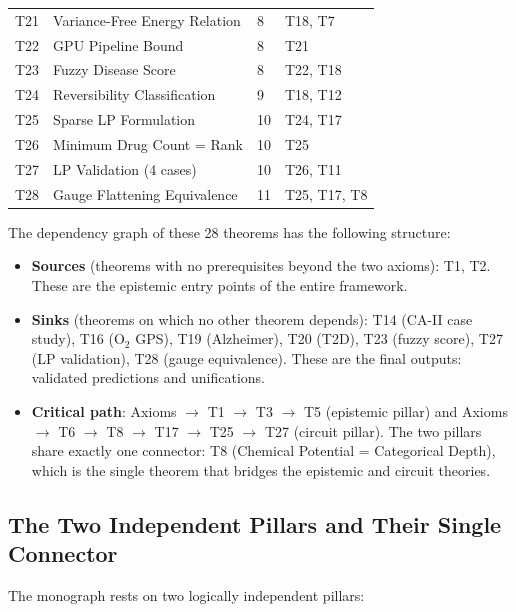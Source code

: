 \begin{table}[!htbp]
\begin{tabular}{@{}p{0.4cm}p{3.2cm}p{0.4cm}p{5.8cm}@{}}
T21 & Variance-Free Energy Relation     & 8  & T18, T7 \\
T22 & GPU Pipeline Bound                & 8  & T21 \\
T23 & Fuzzy Disease Score               & 8  & T22, T18 \\
T24 & Reversibility Classification      & 9  & T18, T12 \\
T25 & Sparse LP Formulation             & 10 & T24, T17 \\
T26 & Minimum Drug Count = Rank         & 10 & T25 \\
T27 & LP Validation (4 cases)           & 10 & T26, T11 \\
T28 & Gauge Flattening Equivalence      & 11 & T25, T17, T8 \\
\bottomrule
\end{tabular}
\end{table}

The dependency graph of these 28 theorems has the following structure:
\begin{itemize}[leftmargin=2em]
  \item \textbf{Sources} (theorems with no prerequisites beyond the two axioms):
    T1, T2.  These are the epistemic entry points of the entire framework.
  \item \textbf{Sinks} (theorems on which no other theorem depends):
    T14 (CA-II case study), T16 (O$_2$ GPS), T19 (Alzheimer), T20 (T2D),
    T23 (fuzzy score), T27 (LP validation), T28 (gauge equivalence).
    These are the final outputs: validated predictions and unifications.
  \item \textbf{Critical path}: Axioms $\to$ T1 $\to$ T3 $\to$ T5 (epistemic pillar)
    and Axioms $\to$ T6 $\to$ T8 $\to$ T17 $\to$ T25 $\to$ T27 (circuit pillar).
    The two pillars share exactly one connector: T8 (Chemical Potential =
    Categorical Depth), which is the single theorem that bridges the epistemic
    and circuit theories.
\end{itemize}

\subsection{The Two Independent Pillars and Their Single Connector}
\label{subsec:ch11-two-pillars}

The monograph rests on two logically independent pillars:

